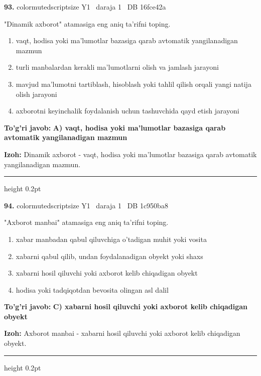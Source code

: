 \documentclass[10pt,a4paper,oneside]{article}
\begin{document}
\noindent\textbf{\color{ink}93.}  {color{muted}scriptsize Y1 \textbullet\ daraja 1 \textbullet\ DB 16fce42a}
\par
"Dinamik axborot" atamasiga eng aniq ta'rifni toping.
\begin{enumerate}[label=\Alph*),leftmargin=9mm]
\item vaqt, hodisa yoki ma'lumotlar bazasiga qarab avtomatik yangilanadigan mazmun
\item turli manbalardan kerakli ma'lumotlarni olish va jamlash jarayoni
\item mavjud ma'lumotni tartiblash, hisoblash yoki tahlil qilish orqali yangi natija olish jarayoni
\item axborotni keyinchalik foydalanish uchun tashuvchida qayd etish jarayoni
\end{enumerate}
\begin{tcolorbox}[enhanced,breakable,colback=teal!4,colframe=teal!50!black,boxrule=0.5pt,arc=1.1mm,left=3mm,right=3mm,top=1.7mm,bottom=1.7mm,before skip=2mm,after skip=2mm]
\textbf{\color{teal}To'g'ri javob:} \textbf{A) vaqt, hodisa yoki ma'lumotlar bazasiga qarab avtomatik yangilanadigan mazmun}
\par\smallskip
\textbf{Izoh:} Dinamik axborot - vaqt, hodisa yoki ma'lumotlar bazasiga qarab avtomatik yangilanadigan mazmun.
\end{tcolorbox}
\vspace{2mm}\hrule height 0.2pt \vspace{3mm}

\noindent\textbf{\color{ink}94.}  {color{muted}scriptsize Y1 \textbullet\ daraja 1 \textbullet\ DB 1c950ba8}
\par
"Axborot manbai" atamasiga eng aniq ta'rifni toping.
\begin{enumerate}[label=\Alph*),leftmargin=9mm]
\item xabar manbadan qabul qiluvchiga o'tadigan muhit yoki vosita
\item xabarni qabul qilib, undan foydalanadigan obyekt yoki shaxs
\item xabarni hosil qiluvchi yoki axborot kelib chiqadigan obyekt
\item hodisa yoki tadqiqotdan bevosita olingan asl dalil
\end{enumerate}
\begin{tcolorbox}[enhanced,breakable,colback=teal!4,colframe=teal!50!black,boxrule=0.5pt,arc=1.1mm,left=3mm,right=3mm,top=1.7mm,bottom=1.7mm,before skip=2mm,after skip=2mm]
\textbf{\color{teal}To'g'ri javob:} \textbf{C) xabarni hosil qiluvchi yoki axborot kelib chiqadigan obyekt}
\par\smallskip
\textbf{Izoh:} Axborot manbai - xabarni hosil qiluvchi yoki axborot kelib chiqadigan obyekt.
\end{tcolorbox}
\vspace{2mm}\hrule height 0.2pt \vspace{3mm}
\end{document}
